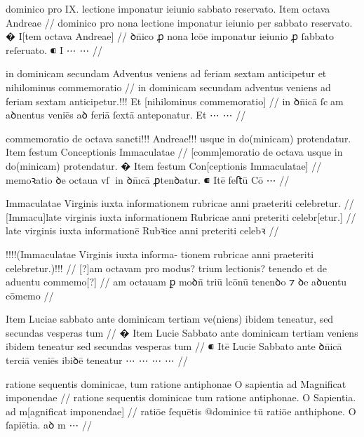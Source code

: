 \ex \bg
\gla
{}
dominico pro IX. {} lectione imponatur ieiunio
{} sabbato reservato.
{} Item octava Andreae 
//
\glRekonstrukcja
{}
dominico pro {} nona lectione imponatur ieiunio per
sabbato reservato.
� I[tem octava Andreae]
//
\glU
{}
ꝺn̄ico ꝓ {} nona lcōe imponatur ieiunio ꝓ ſabbato reſeruato. ⁌ I ⋯ ⋯
//
\endgl
\xe


\ex \bg
\gla
{}
in dominicam secundam Adventus veniens
ad feriam sextam anticipetur et nihilominus commemoratio
//
\glRekonstrukcja
{}
in dominicam secundam adventus veniens
ad feriam sextam anticipetur.!!! Et [nihilominus commemoratio]
//
\glU
{}
in ꝺn̄icā ſcam aꝺnentus veniēs aꝺ feriā ſextā anteponatur. Et ⋯ ⋯
//
\endgl
\xe



\ex \bg
\gla
{}
commemoratio de octava
sancti!!! Andreae!!! usque in do(minicam) protendatur.
{} Item festum Conceptionis Immaculatae
//
\glRekonstrukcja
{}
[comm]emoratio de octava
{} {} usque in do(minicam) protendatur.
� Item festum Con[ceptionis Immaculatae]
//
\glU
{}
memoꝛatio ꝺe octaua {} {} vſ in ꝺn̄ıcā ꝓtenꝺatur. ⁌ Itē feﬅū Cō ⋯
//
\endgl
\xe



\ex \bg
\gla
{}
Immaculatae Virginis iuxta informationem rubricae anni praeteriti celebretur.
//
\glRekonstrukcja
{}
[Immacu]late virginis iuxta informationem Rubricae anni preteriti celebr[etur.]
//
\glU
{}
late virginis iuxta informationē Rubꝛice anni preteriti celebꝛ
//
\endgl
\xe



\ex \bg
\gla
{}
!!!!(Immaculatae Virginis iuxta informa-
tionem rubricae anni praeteriti celebretur.)!!!
//
\glRekonstrukcja
{}
[?]am octavam pro modus? trium lectionis? tenendo et de aduentu commemo[?]
//
\glU
{}
am octauam ꝑ moꝺn̄ triū lcōnū tenenꝺo ⁊ ꝺe aꝺuentu cōmemo
//
\endgl
\xe



\ex \bg
\gla
{}
{} Item Luciae sabbato ante dominicam tertiam ve(niens) ibidem
teneatur, sed secundas vesperas tum 
//
\glRekonstrukcja
{}
� Item Lucie Sabbato ante dominicam tertiam veniens ibidem
teneatur {sed secundas vesperas tum}
//
\glU
{}
⁌ Itē Lucie Sabbato ante ꝺn̄icā terciā veniēs ibiꝺē teneatur ⋯ ⋯ ⋯ ⋯ 
//
\endgl
\xe

\ex \bg
\gla
{}
ratione sequentis dominicae, tum
ratione antiphonae O sapientia ad Magnificat imponendae
//
\glRekonstrukcja
{}
ratione sequentis dominicae tum
ratione antiphonae. O Sapientia. ad m[agnificat imponendae]
//
\glU
{}
ratiōe ſequētis @dominice tū ratiōe anthiphone. O ſapiētia. aꝺ m ⋯
//
\endgl
\xe



